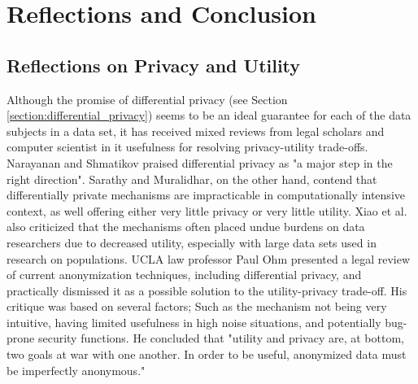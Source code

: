 
\chapter{Reflections and Conclusion}

%
%

\section{Reflections on Privacy and Utility }

Although the promise of differential privacy (see Section \ref{section:differential_privacy}) seems to be an ideal guarantee for each of the data subjects in a data set, it has received mixed reviews from legal scholars and computer scientist in it usefulness for resolving privacy-utility trade-offs. Narayanan and Shmatikov praised differential privacy as "a major step in the right direction\citep{narayanan2010myths}". Sarathy and Muralidhar, on the other hand, contend that differentially private mechanisms are impracticable in computationally intensive context, as well offering either very little privacy or very little utility\citep{Sarathy2011evaluating}. Xiao et al. also criticized that the mechanisms often placed undue burdens on data researchers due to decreased utility, especially with large data sets used in research on populations\citep{xiao2011differential}. UCLA law professor Paul Ohm presented a legal review of current anonymization techniques, including differential privacy, and practically dismissed it as a possible solution to the utility-privacy trade-off. His critique was based on several factors; Such as the mechanism not being very intuitive, having limited usefulness in high noise situations, and potentially bug-prone security functions. He concluded that "utility and privacy are, at bottom, two goals at war with one another. In order to be useful, anonymized data must be imperfectly anonymous\citep{ohm2010brokenPrivacyPromise}."

